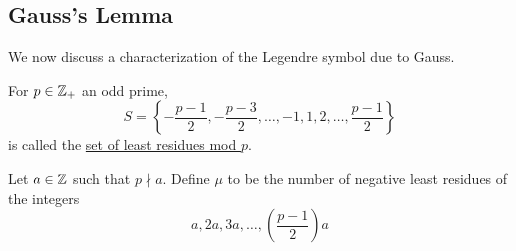 \subsection{Gauss's Lemma}
We now discuss a characterization of the Legendre symbol due to Gauss.
\begin{definition}
    For $p\in\mathbb Z_+$ an odd prime,
    \[S = \left\{-\frac{p-1}{2}, -\frac{p-3}{2}, \dots, -1, 1, 2, \dots, \frac{p-1}{2}\right\}\]
    is called the \ul{set of least residues mod $p$}.
\end{definition}

\begin{definition}
    Let $a\in\mathbb Z$ such that $p\nmid a$. Define $\mu$ to be the number of negative least residues of the integers
    \[a, 2a, 3a, \dots, \left(\frac{p-1}{2}\right)a\]
\end{definition}

